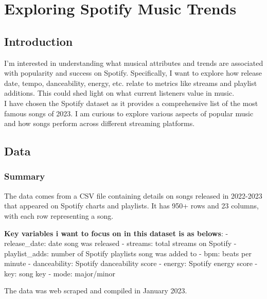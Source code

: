 \documentclass[
]{article}
\begin{document}
\hypertarget{exploring-spotify-music-trends}{%
\section{Exploring Spotify Music
Trends}\label{exploring-spotify-music-trends}}

\hypertarget{introduction}{%
\subsection{Introduction}\label{introduction}}

I'm interested in understanding what musical attributes and trends are
associated with popularity and success on Spotify. Specifically, I want
to explore how release date, tempo, danceability, energy, etc. relate to
metrics like streams and playlist additions. This could shed light on
what current listeners value in music.\\
I have chosen the Spotify dataset as it provides a comprehensive list of
the most famous songs of 2023. I am curious to explore various aspects
of popular music and how songs perform across different streaming
platforms.

\hypertarget{data}{%
\subsection{Data}\label{data}}

\hypertarget{summary}{%
\subsubsection{Summary}\label{summary}}

The data comes from a CSV file containing details on songs released in
2022-2023 that appeared on Spotify charts and playlists. It has 950+
rows and 23 columns, with each row representing a song.

\textbf{Key variables i want to focus on in this dataset is as belows}:
- release\_date: date song was released - streams: total streams on
Spotify - playlist\_adds: number of Spotify playlists song was added to
- bpm: beats per minute - danceability: Spotify danceability score -
energy: Spotify energy score - key: song key - mode: major/minor

The data was web scraped and compiled in January 2023.
\end{document}

